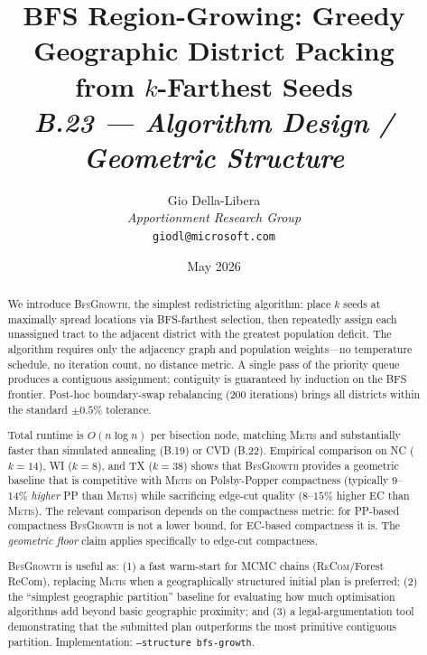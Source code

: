 \documentclass[12pt]{article}
\title{%
  \textbf{BFS Region-Growing: Greedy Geographic District Packing}\\
  \textbf{from $k$-Farthest Seeds}\\[0.8em]
  \normalsize\textit{B.23 --- Algorithm Design / Geometric Structure}%
}
\author{%
  Gio Della-Libera\\
  \textit{Apportionment Research Group}\\
  \small\texttt{giodl@microsoft.com}
}
\date{May 2026}
\newcommand{\bfsg}{\textsc{BfsGrowth}}
\newcommand{\metis}{\textsc{Metis}}
\newcommand{\recom}{\textsc{ReCom}}
\begin{document}
\maketitle

\begin{abstract}
\noindent
We introduce \bfsg{}, the simplest redistricting algorithm: place $k$ seeds
at maximally spread locations via BFS-farthest selection, then repeatedly
assign each unassigned tract to the adjacent district with the greatest
population deficit.
The algorithm requires only the adjacency graph and population weights---no
temperature schedule, no iteration count, no distance metric.
A single pass of the priority queue produces a contiguous assignment;
contiguity is guaranteed by induction on the BFS frontier.
Post-hoc boundary-swap rebalancing (200 iterations) brings all districts
within the standard $\pm 0.5\%$ tolerance.

Total runtime is $O(n \log n)$ per bisection node, matching \metis{} and
substantially faster than simulated annealing (B.19) or CVD (B.22).
Empirical comparison on NC ($k=14$), WI ($k=8$), and TX ($k=38$) shows
that \bfsg{} provides a geometric baseline that is competitive with \metis{}
on Polsby-Popper compactness (typically $9$--$14\%$ \emph{higher} PP than
\metis{}) while sacrificing edge-cut quality ($8$--$15\%$ higher EC than
\metis{}).
The relevant comparison depends on the compactness metric: for PP-based
compactness \bfsg{} is not a lower bound, for EC-based compactness it is.
The \emph{geometric floor} claim applies specifically to edge-cut compactness.

\bfsg{} is useful as: (1) a fast warm-start for MCMC chains
(\recom{}/Forest ReCom), replacing \metis{} when a geographically
structured initial plan is preferred; (2) the ``simplest geographic
partition'' baseline for evaluating how much optimisation algorithms
add beyond basic geographic proximity; and (3) a legal-argumentation
tool demonstrating that the submitted plan outperforms the most
primitive contiguous partition.
Implementation: \texttt{--structure bfs-growth}.
\end{abstract}










\end{document}
